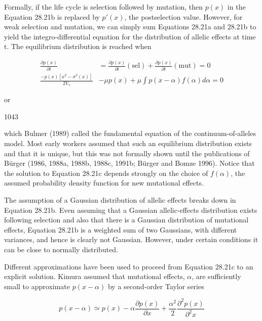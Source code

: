 \documentclass{article}
\begin{document}
Formally, if the life cycle is selection followed by mutation, then  $ p(x) $ in the Equation 28.21b is replaced by  $ p'(x) $, the postselection value. However, for weak selection and mutation, we can simply sum Equations 28.21a and 28.21b to yield the integro-differential equation for the distribution of allelic effects at time t. The equilibrium distribution is reached when

\begin{equation}
\begin{aligned}\frac{\partial p(x)}{\partial t}&=\frac{\partial p(x)}{\partial t}(\mathrm{sel})+\frac{\partial p(x)}{\partial t}(\mathrm{mut})=0\\\frac{-p(x)[x^{2}-\sigma^{2}(x)]}{2V_{s}}&-\mu p(x)+\mu\int p(x-\alpha)f(\alpha)d\alpha=0\end{aligned}
\tag{28.21c}
\label{eq:28_21c}
\end{equation}

or

1043

which Bulmer (1989) called the fundamental equation of the continuum-of-alleles model. Most early workers assumed that such an equilibrium distribution exists and that it is unique, but this was not formally shown until the publications of Bürger (1986, 1988a, 1988b, 1988c, 1991b; Bürger and Bomze 1996). Notice that the solution to Equation 28.21c depends strongly on the choice of  $ f(\alpha) $, the assumed probability density function for new mutational effects.

The assumption of a Gaussian distribution of allelic effects breaks down in Equation 28.21b. Even assuming that a Gaussian allelic-effects distribution exists following selection and also that there is a Gaussian distribution of mutational effects, Equation 28.21b is a weighted sum of two Gaussians, with different variances, and hence is clearly not Gaussian. However, under certain conditions it can be close to normally distributed.

Different approximations have been used to proceed from Equation 28.21c to an explicit solution. Kimura assumed that mutational effects,  $ \alpha $, are sufficiently small to approximate  $ p(x - \alpha) $ by a second-order Taylor series

\begin{equation}
p(x-\alpha)\simeq p(x)-\alpha\frac{\partial p(x)}{\partial x}+\frac{\alpha^{2}}{2}\frac{\partial^{2}p(x)}{\partial^{2}x}
\tag{28.22a}
\label{eq:28_22a}
\end{equation}
\end{document}
